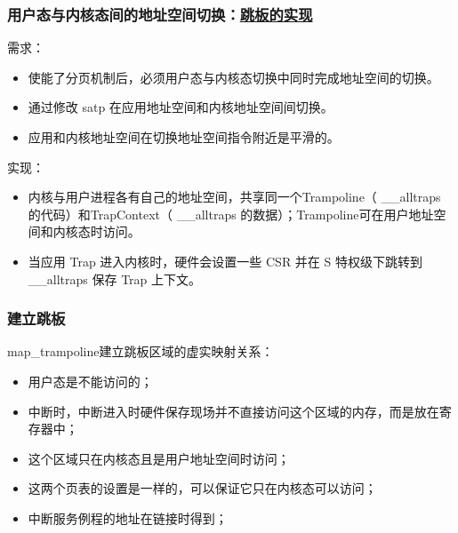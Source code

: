 \begin{frame}
    \frametitle{用户态与内核态间的地址空间切换：\href{https://rcore-os.github.io/rCore-Tutorial-Book-v3/chapter4/6multitasking-based-on-as.html\#id6}{跳板的实现}}
% 

% 
需求：
% 
        \begin{itemize}
        \item 使能了分页机制后，必须用户态与内核态切换中同时完成地址空间的切换。
        \item 通过修改 satp 在应用地址空间和内核地址空间间切换。
        \item 应用和内核地址空间在切换地址空间指令附近是平滑的。
        \end{itemize} \pause
% 
实现：
% 
        \begin{itemize}
        \item 内核与用户进程各有自己的地址空间，共享同一个Trampoline（ \_\_alltraps 的代码）和TrapContext（ \_\_alltraps 的数据）；Trampoline可在用户地址空间和内核态时访问。
        \item 当应用 Trap 进入内核时，硬件会设置一些 CSR 并在 S 特权级下跳转到 \_\_alltraps 保存 Trap 上下文。
        \end{itemize}
% 
\end{frame}
\begin{frame}
    \frametitle{建立跳板}
% 
map\_trampoline建立跳板区域的虚实映射关系：
% 
        \begin{itemize}
        \item 用户态是不能访问的；
        \item 中断时，中断进入时硬件保存现场并不直接访问这个区域的内存，而是放在寄存器中；
        \item 这个区域只在内核态且是用户地址空间时访问；
        \item 这两个页表的设置是一样的，可以保证它只在内核态可以访问；
        \item 中断服务例程的地址在链接时得到；
        \end{itemize}
\end{frame}



